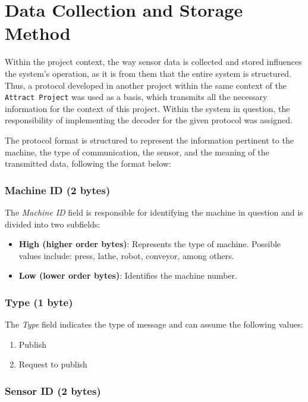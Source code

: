 \section[Data Collection and Storage Method]{Data Collection and Storage Method}

Within the project context, the way sensor data is collected and stored influences the system's operation, as it is from them that the entire system is structured. Thus, a protocol developed in another project within the same context of the \texttt{Attract Project} was used as a basis, which transmits all the necessary information for the context of this project. Within the system in question, the responsibility of implementing the decoder for the given protocol was assigned.

The protocol format is structured to represent the information pertinent to the machine, the type of communication, the sensor, and the meaning of the transmitted data, following the format below:

\subsubsection{Machine ID (2 bytes)}

The \textit{Machine ID} field is responsible for identifying the machine in question and is divided into two subfields:

\begin{itemize}
    \item \textbf{High (higher order bytes)}: Represents the type of machine. Possible values include: press, lathe, robot, conveyor, among others.
    \item \textbf{Low (lower order bytes)}: Identifies the machine number.
\end{itemize}

\subsubsection{Type (1 byte)}

The \textit{Type} field indicates the type of message and can assume the following values:
\begin{enumerate}
    \item Publish
    \item Request to publish
\end{enumerate}

\subsubsection{Sensor ID (2 bytes)}


